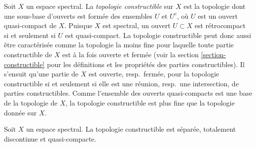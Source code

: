 \medskip\noindent
Soit $X$ un espace spectral. La {\it topologie constructible} sur $X$
est la topologie dont une sous-base d'ouverts est formée des ensembles $U$
et $U^c$, où $U$ est un ouvert quasi-compact de $X$. Puisque $X$ est spectral,
un ouvert $U \subset X$ est rétrocompact si et seulement si $U$ est
quasi-compact. La topologie constructible peut donc aussi être caractérisée
comme la topologie la moins fine pour laquelle toute partie constructible de
$X$ est à la fois ouverte et fermée (voir la section
\ref{section-constructible} pour les définitions et les propriétés des parties
constructibles).
Il s'ensuit qu'une partie de $X$ est ouverte, resp.\ fermée, pour la topologie
constructible si et seulement si elle est une réunion, resp.\ une intersection,
de parties constructibles. Comme l'ensemble des ouverts quasi-compacts est une
base de la topologie de $X$, la topologie constructible est plus fine que la
topologie donnée sur $X$.

\begin{lemma}
\label{lemma-constructible-hausdorff-quasi-compact}
Soit $X$ un espace spectral. La topologie constructible est séparée,
totalement discontinue et quasi-compacte.
\end{lemma}

